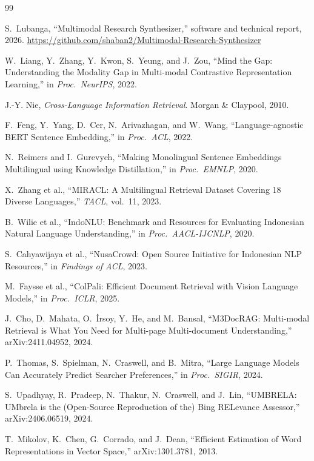 \documentclass[conference]{IEEEtran}
\begin{document}
\begin{thebibliography}{99}
\raggedright

 S.~Lubanga,
``Multimodal Research Synthesizer,'' software and technical report, 2026.
\url{https://github.com/shaban2/Multimodal-Research-Synthesizer}

 W.~Liang, Y.~Zhang, Y.~Kwon, S.~Yeung, and J.~Zou,
``Mind the Gap: Understanding the Modality Gap in Multi-modal Contrastive
Representation Learning,'' in \emph{Proc.\ NeurIPS}, 2022.

 J.-Y. Nie, \emph{Cross-Language Information Retrieval}.
Morgan \& Claypool, 2010.

 F.~Feng, Y.~Yang, D.~Cer, N.~Arivazhagan, and W.~Wang,
``Language-agnostic BERT Sentence Embedding,'' in \emph{Proc.\ ACL}, 2022.

 N.~Reimers and I.~Gurevych, ``Making Monolingual Sentence
Embeddings Multilingual using Knowledge Distillation,'' in \emph{Proc.\
EMNLP}, 2020.

 X.~Zhang et al., ``MIRACL: A Multilingual Retrieval
Dataset Covering 18 Diverse Languages,'' \emph{TACL}, vol.~11, 2023.

 B.~Wilie et al., ``IndoNLU: Benchmark and Resources for
Evaluating Indonesian Natural Language Understanding,'' in \emph{Proc.\
AACL-IJCNLP}, 2020.

 S.~Cahyawijaya et al., ``NusaCrowd: Open Source
Initiative for Indonesian NLP Resources,'' in \emph{Findings of ACL}, 2023.

\bibitem{colpali} M.~Faysse et al., ``ColPali: Efficient Document Retrieval
with Vision Language Models,'' in \emph{Proc.\ ICLR}, 2025.

 J.~Cho, D.~Mahata, O.~\.Irsoy, Y.~He, and M.~Bansal,
``M3DocRAG: Multi-modal Retrieval is What You Need for Multi-page
Multi-document Understanding,'' arXiv:2411.04952, 2024.

 P.~Thomas, S.~Spielman, N.~Craswell, and B.~Mitra,
``Large Language Models Can Accurately Predict Searcher Preferences,'' in
\emph{Proc.\ SIGIR}, 2024.

 S.~Upadhyay, R.~Pradeep, N.~Thakur, N.~Craswell, and
J.~Lin, ``UMBRELA: UMbrela is the (Open-Source Reproduction of the) Bing
RELevance Assessor,'' arXiv:2406.06519, 2024.

 T.~Mikolov, K.~Chen, G.~Corrado, and J.~Dean,
``Efficient Estimation of Word Representations in Vector Space,''
arXiv:1301.3781, 2013.


\end{thebibliography}
\end{document}
